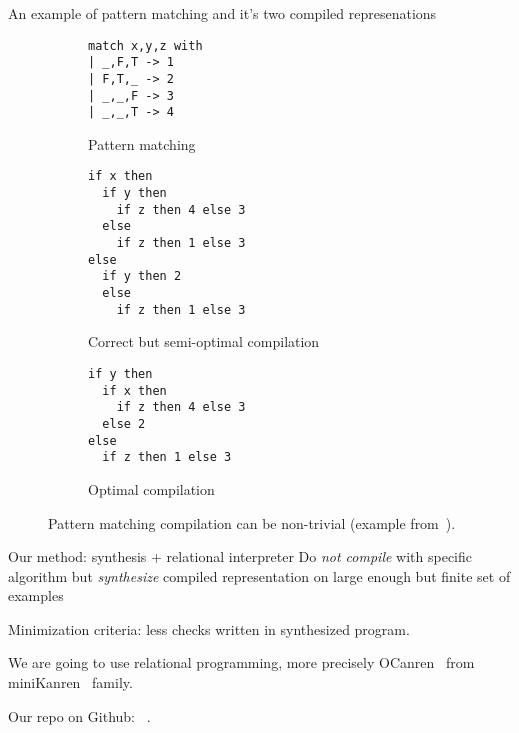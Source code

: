 \documentclass[aspectratio=169
  , xcolor={svgnames}
  , hyperref={ colorlinks,citecolor=Blue
             , linkcolor=DarkRed,urlcolor=DarkBlue}
  , russian
  ]{beamer}
\begin{document}
\begin{frame}[fragile]{An example of pattern matching and it's two compiled represenations}
\begin{figure}[ht]
\begin{subfigure}[b]{0.25\linewidth}
\begin{lstlisting}
match x,y,z with
| _,F,T -> 1
| F,T,_ -> 2
| _,_,F -> 3
| _,_,T -> 4
\end{lstlisting}
\caption{Pattern matching}
\end{subfigure}
\hspace{0.5cm}
\begin{subfigure}[b]{0.32\linewidth}
\begin{lstlisting}
if x then
  if y then
    if z then 4 else 3
  else
    if z then 1 else 3
else
  if y then 2
  else
    if z then 1 else 3
\end{lstlisting}
\caption{Correct but semi-optimal compilation}
\label{fig:matching-example2}
\end{subfigure}
\hspace{0.5cm}
\begin{subfigure}[b]{0.3\linewidth}
\centering
\begin{lstlisting}
if y then
  if x then
    if z then 4 else 3
  else 2
else
  if z then 1 else 3
\end{lstlisting}
\caption{Optimal compilation}
\label{fig:matching-example3}
\end{subfigure}
\caption{Pattern matching compilation can be non-trivial (example from~\cite{maranget2008}).}
\label{fig:match-example}
\end{figure}
\end{frame}

\begin{frame}{Our method: synthesis + relational interpreter}
Do \emph{not compile} with specific algorithm but \emph{synthesize} compiled representation on large enough but finite set of examples
\vspace{1cm}

Minimization criteria: less checks written in synthesized program.
\vspace{1cm}

We are going to use relational programming, more precisely OCanren~\cite{OCanrenWeb} from miniKanren~\cite{MiniKanrenWeb} family.
\vspace{1cm}


Our repo on Github: ~\cite{Repo}.
\end{frame}
\end{document}
